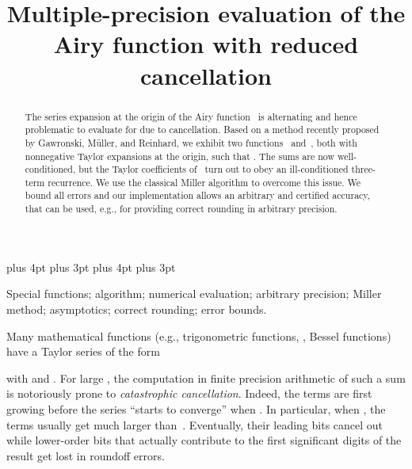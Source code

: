 \documentclass[10pt, conference]{IEEEtran}
\begin{document}
\setlength{\emergencystretch}{1em}
\abovedisplayskip=3pt plus 4pt
\abovedisplayshortskip=0pt plus 3pt
\belowdisplayskip=3pt plus 4pt
\belowdisplayshortskip=0pt plus 3pt
\setlength{\textfloatsep}{5pt} 
\setlength{\abovecaptionskip}{0pt}
\setlength{\belowcaptionskip}{0pt}

\title{Multiple-precision evaluation of the Airy  function with
reduced cancellation}
\author{
    \and
}
\maketitle


\begin{abstract}
The series expansion at the origin of the Airy function~ is alternating and hence problematic to evaluate for  due to cancellation.
Based on a method recently proposed by Gawronski,
M\"uller, and Reinhard, we exhibit two functions ~and~, both with
nonnegative Taylor expansions at the origin, such that . The sums are now well-conditioned, but the Taylor coefficients
of~ turn out to obey an ill-conditioned three-term recurrence. We use the
classical Miller algorithm to overcome this issue. We bound
all errors and our implementation allows an arbitrary and certified accuracy,
that can be used, e.g., for providing correct rounding in arbitrary precision.
\end{abstract}

\begin{IEEEkeywords}
Special functions; algorithm; numerical evaluation; arbitrary precision; Miller method; asymptotics; correct rounding; error bounds.
\end{IEEEkeywords}

\newcommand\mightbeomitted{}



Many mathematical functions (e.g., trigonometric functions, , Bessel functions) have a Taylor series of the form

with  and .
For large , the computation in finite precision arithmetic of such a sum
is notoriously prone to {\emph{catastrophic cancellation}}.
Indeed, the terms  are first growing before the series ``starts to
converge'' when . In particular, when ,
the terms  usually get much larger than~. Eventually, their leading
bits cancel out while lower-order bits that actually contribute to the first
significant digits of the result get lost in roundoff errors.
\end{document}

